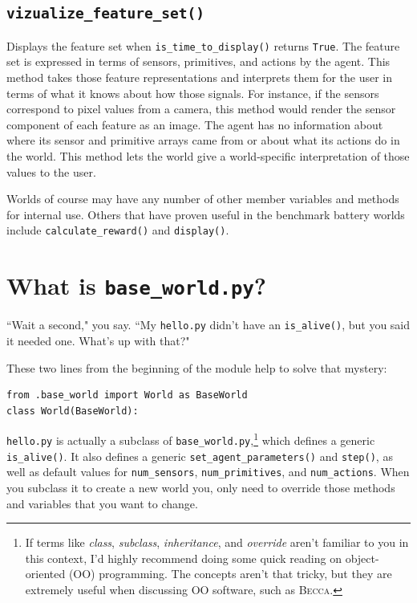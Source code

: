 \subsection{\texttt{vizualize\_feature\_set()}}
Displays the feature set when \texttt{is\_time\_to\_display()} returns \texttt{True}. The feature set is expressed in terms of sensors, primitives, and actions by the agent. This method takes those feature representations and interprets them for the user in terms of what it knows about how those signals. For instance, if the sensors correspond to pixel values from a camera, this method would render the sensor component of each feature as an image. The agent has no information about where its sensor and primitive arrays came from or about what its actions do in the world. This method lets the world give a world-specific interpretation of those values to the user.

Worlds of course may have any number of other member variables and methods for internal use. Others that have proven useful in the benchmark battery worlds include \texttt{calculate\_reward()} and \texttt{display()}.

\section{What is \texttt{base\_world.py}?}
``Wait a second," you say. ``My \texttt{hello.py} didn't have an \texttt{is\_alive()}, but you said it needed one. What's up with that?"

These two lines from the beginning of the module help to solve that mystery:
\begin{verbatim}
from .base_world import World as BaseWorld
class World(BaseWorld):
\end{verbatim}

\texttt{hello.py} is actually a subclass of \texttt{base\_world.py},\footnote{If terms like {\em class}, {\em subclass}, {\em inheritance}, and {\em override} aren't familiar to you in this context, I'd highly recommend doing some quick reading on object-oriented (OO) programming. The concepts aren't that tricky, but they are extremely useful when discussing OO software, such as \textsc{Becca}.} which defines a generic \texttt{is\_alive()}. It also defines a generic \texttt{set\_agent\_parameters()} and \texttt{step()}, as well as default values for  \texttt{num\_sensors}, \texttt{num\_primitives}, and \texttt{num\_actions}. When you subclass it to create a new world you, only need to override those methods and variables that you want to change.



